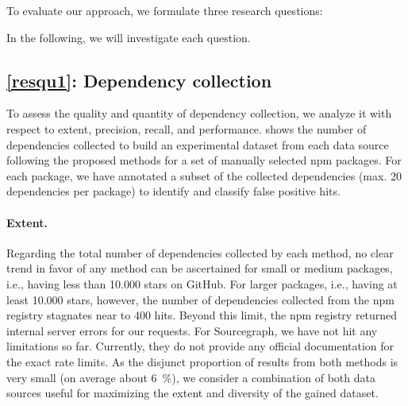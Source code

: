 \documentclass[a4paper,twoside]{article}
\begin{document}
To evaluate our approach, we formulate three research questions:

In the following, we will investigate each question.

\subsection{\ref{resqu1}: Dependency collection}
\label{sec:evaluation/resqu1}

To assess the quality and quantity of dependency collection, we analyze it with respect to extent, precision, recall, and performance.
 shows the number of dependencies collected to build an experimental dataset from each data source following the proposed methods for a set of manually selected npm packages.
For each package, we have annotated a subset of the collected dependencies (max. 20 dependencies per package) to identify and classify false positive hits.

\paragraph{Extent.}
\label{sec:evaluation/resqu1/extent}

Regarding the total number of dependencies collected by each method, no clear trend in favor of any method can be ascertained for small or medium packages, i.e., having less than \num{10,000} stars on GitHub.
For larger packages, i.e., having at least \num{10,000} stars, however, the number of dependencies collected from the npm registry stagnates near to 400 hits.
Beyond this limit, the npm registry returned internal server errors for our requests.
For Sourcegraph, we have not hit any limitations so far.
Currently, they do not provide any official documentation for the exact rate limits.
As the disjunct proportion of results from both methods is very small (on average about \SI{6}{\percent}), we consider a combination of both data sources useful for maximizing the extent and diversity of the gained dataset.
\end{document}
